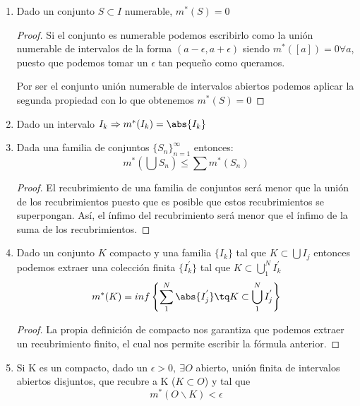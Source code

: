 \documentclass{apuntes}
\begin{document}
\begin{enumerate}
\begin{proof}
Por tanto queda claro que no puede ser $m^*(S) < inf\left\{m^*(O)\right\}$.
\end{proof}

De esta propiedad puede extraerse que $ m^*(S) = m^*(O)$

%
\item Dado un conjunto $S \subset I$  numerable, $m^*(S)=0$
\begin{proof}
Si el conjunto es numerable podemos escribirlo como la unión numerable de intervalos de la forma $(a-\epsilon, a +\epsilon)$ siendo $m^*([a])=0 \forall a$, puesto que podemos tomar un $\epsilon$ tan pequeño como queramos.

Por ser el conjunto unión numerable de intervalos abiertos podemos aplicar la segunda propiedad con lo que obtenemos $m^*(S)=0$
\end{proof}

%
\item Dado un intervalo $I_k \Rightarrow m^*(I_k)=\abs{I_k}$

%
\item Dada una familia de conjuntos $\lbrace S_n\rbrace_{n=1}^{\infty}$  entonces:
\[m^*(\bigcup S_n) \leq \sum m^*(S_n)\]
\begin{proof}
El recubrimiento de una familia de conjuntos será menor que la unión de los recubrimientos puesto que es posible que estos recubrimientos se superpongan. Así, el ínfimo del recubrimiento será menor que el ínfimo de la suma de los recubrimientos.
\end{proof}


%
\item Dado un conjunto $K$ compacto y una familia $\lbrace I_k \rbrace$ tal que $K \subset \bigcup I_j$ entonces podemos extraer una colección finita $\lbrace I_k^{'} \rbrace$ tal que $K \subset \bigcup_1^N I_k^{'}$
\[m^*(K) = inf\left\{\sum_1^N \abs{I_j^{'}} \tq K\subset \bigcup_1^N I_j^{'} \right\}\]
\begin{proof}
La propia definición de compacto nos garantiza que podemos extraer un recubrimiento finito, el cual nos permite escribir la fórmula anterior.
\end{proof}

%
\item Si K es un compacto, dado un $\epsilon > 0, \ \exists O$ abierto, unión finita de intervalos abiertos disjuntos, que recubre a K ($K\subset O$) y tal que
\[m^*(O\smallsetminus K) < \epsilon\]


\end{enumerate}
\end{document}

